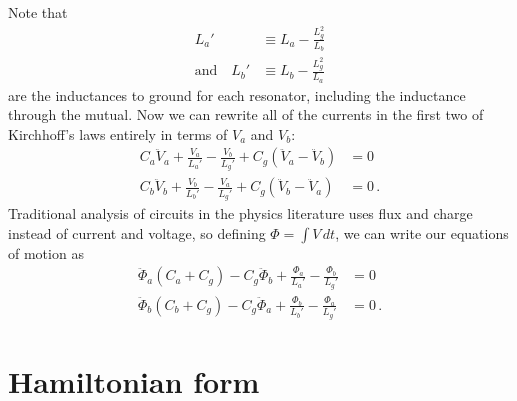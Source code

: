 \documentclass{article}
\begin{document}
Note that
\begin{align*}
  L_a' & \equiv L_a - \frac{L_g^2}{L_b} \\
  \text{and} \quad
  L_b' & \equiv L_b - \frac{L_g^2}{L_a}
\end{align*}
are the inductances to ground for each resonator, including the inductance through the mutual.
Now we can rewrite all of the currents in the first two of Kirchhoff's laws entirely in terms of $V_a$ and $V_b$:
\begin{align*}
  C_a \ddot V_a + \frac{V_a}{L_a'} - \frac{V_b}{L_g'} + C_g (\ddot V_a - \ddot V_b) &= 0 \\
  C_b \ddot V_b + \frac{V_b}{L_b'} - \frac{V_a}{L_g'} + C_g (\ddot V_b - \ddot V_a) &= 0 \, .
\end{align*}
Traditional analysis of circuits in the physics literature uses flux and charge instead of current and voltage, so defining $\Phi = \int V \, dt$, we can write our equations of motion as
\begin{align*}
  \ddot \Phi_a (C_a + C_g) - C_g \ddot \Phi_b + \frac{\Phi_a}{L_a'} - \frac{\Phi_b}{L_g'} &= 0 \\
  \ddot \Phi_b (C_b + C_g) - C_g \ddot \Phi_a + \frac{\Phi_b}{L_b'} - \frac{\Phi_a}{L_g'} &= 0 \, .
\end{align*}

\section{Hamiltonian form}
\end{document}
